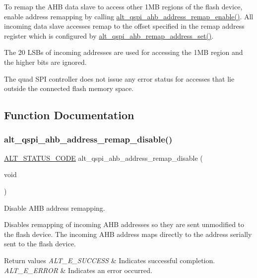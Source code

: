 To remap the A\+HB data slave to access other 1MB regions of the flash device, enable address remapping by calling \mbox{\hyperlink{group__ALT__QSPI__DAC_ga0663558383dd05011ee908f98acbf0b0}{alt\+\_\+qspi\+\_\+ahb\+\_\+address\+\_\+remap\+\_\+enable()}}. All incoming data slave accesses remap to the offset specified in the remap address register which is configured by \mbox{\hyperlink{group__ALT__QSPI__DAC_gad7b0dc3a61560e7d7c2edeb9204698ad}{alt\+\_\+qspi\+\_\+ahb\+\_\+remap\+\_\+address\+\_\+set()}}.

The 20 L\+S\+Bs of incoming addresses are used for accessing the 1MB region and the higher bits are ignored.

The quad S\+PI controller does not issue any error status for accesses that lie outside the connected flash memory space. 

\subsection{Function Documentation}
\mbox{\label{group__ALT__QSPI__DAC_ga7df90b3cb6c7074554eaf324b72a3b00}} 
\subsubsection{\texorpdfstring{alt\_qspi\_ahb\_address\_remap\_disable()}{alt\_qspi\_ahb\_address\_remap\_disable()}}
{\footnotesize\ttfamily \mbox{\hyperlink{hwlib_8h_abdb0d369f069723ca55d6c94bcaaaa12}{A\+L\+T\+\_\+\+S\+T\+A\+T\+U\+S\+\_\+\+C\+O\+DE}} alt\+\_\+qspi\+\_\+ahb\+\_\+address\+\_\+remap\+\_\+disable (\begin{DoxyParamCaption}\item[{void}]{ }\end{DoxyParamCaption})}

Disable A\+HB address remapping.

Disables remapping of incoming A\+HB addresses so they are sent unmodified to the flash device. The incoming A\+HB address maps directly to the address serially sent to the flash device.


\begin{DoxyRetVals}{Return values}
{\em A\+L\+T\+\_\+\+E\+\_\+\+S\+U\+C\+C\+E\+SS} & Indicates successful completion. \\
\hline
{\em A\+L\+T\+\_\+\+E\+\_\+\+E\+R\+R\+OR} & Indicates an error occurred. \\
\hline
\end{DoxyRetVals}
\mbox{\label{group__ALT__QSPI__DAC_ga0663558383dd05011ee908f98acbf0b0}} 
